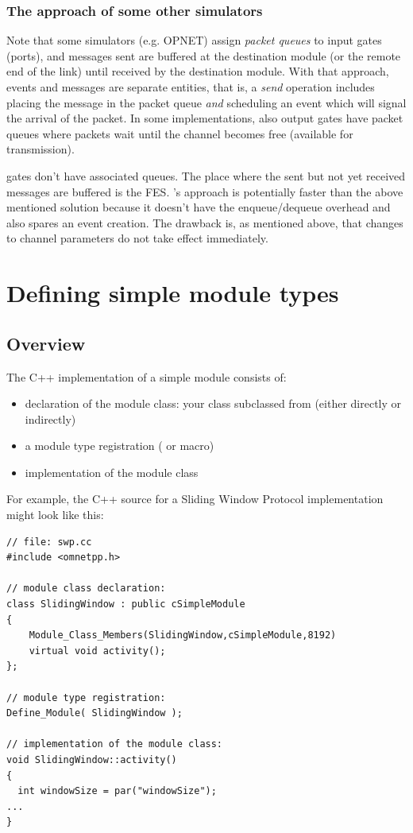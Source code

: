 \subsubsection{The approach of some other simulators}


Note that some simulators (e.g. OPNET) assign \textit{packet queues}
to input gates (ports), and messages sent are buffered at the
destination module (or the remote end of the link) until received by
the destination module. With that approach, events and messages are
separate entities, that is, a \textit{send} operation includes placing
the message in the packet queue \textit{and} scheduling an event which
will signal the arrival of the packet. In some implementations, also
output gates have packet queues where packets wait until the channel
becomes free (available for transmission).

{\opp} gates don't have associated queues. The place
where the sent but not yet received messages are buffered is the
FES.  {\opp}'s approach is potentially faster
than the above mentioned solution because it doesn't have the
enqueue/dequeue overhead and also spares an event creation. The
drawback is, as mentioned above, that changes to channel parameters do
not take effect immediately.




\section{Defining simple module types}

\subsection{Overview}

The C++ implementation of a simple module consists of:
\begin{itemize}
\item{declaration of the module class: your class subclassed from 
(either directly or indirectly)}
\item{a module type registration ( or
     macro)}
\item{implementation of the module class}
\end{itemize}


For example, the C++ source for a Sliding Window Protocol implementation
might look like this:

\begin{verbatim}
// file: swp.cc
#include <omnetpp.h>

// module class declaration:
class SlidingWindow : public cSimpleModule
{
    Module_Class_Members(SlidingWindow,cSimpleModule,8192)
    virtual void activity();
};

// module type registration:
Define_Module( SlidingWindow );

// implementation of the module class:
void SlidingWindow::activity()
{
  int windowSize = par("windowSize");
...
}
\end{verbatim}

